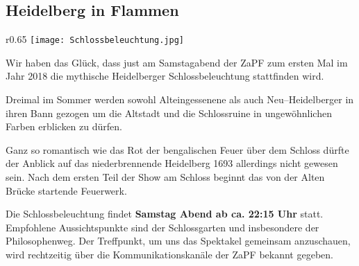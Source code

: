 
\subsection*{Heidelberg in Flammen} %

\begin{wrapfigure}{r}{0.65\textwidth}
\vspace*{-25pt}
\texttt{[image: Schlossbeleuchtung.jpg]}
\vspace*{-25pt}
\end{wrapfigure}
Wir haben das Glück, dass just am Samstagabend der ZaPF zum ersten Mal im Jahr 2018 die mythische Heidelberger Schlossbeleuchtung stattfinden wird.

Dreimal im Sommer werden sowohl Alteingessenene als auch Neu--Heidelberger in ihren Bann gezogen um die Altstadt und die Schlossruine in ungewöhnlichen Farben erblicken zu dürfen.

Ganz so romantisch wie das Rot der bengalischen Feuer über dem Schloss dürfte der Anblick auf das niederbrennende Heidelberg 1693 allerdings nicht gewesen sein. Nach dem ersten Teil der Show am Schloss beginnt das von der Alten Brücke startende Feuerwerk. 

Die Schlossbeleuchtung findet \textbf{Samstag Abend ab ca. 22:15 Uhr} statt. Empfohlene Aussichtspunkte sind der Schlossgarten und insbesondere der Philosophenweg. Der Treffpunkt, um uns das Spektakel gemeinsam anzuschauen, wird rechtzeitig über die Kommunikationskanäle der ZaPF bekannt gegeben.
